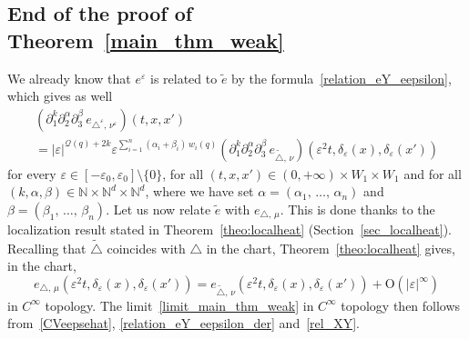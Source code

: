 \documentclass[AHL,Unicode,published]{cedram}
\newcommand*\N{\mathbb{N}}
\newcommand{\calQ}{\mathcal{Q}}
\newcommand{\rmO}{\mathrm{O}}
\begin{document}
\subsection{End of the proof of Theorem~\ref{main_thm_weak}}\label{sec_proof_weak_main_thm}
We already know that $e^\varepsilon$ is related to $\widetilde e$ by the formula~\eqref{relation_eY_eepsilon}, which gives as well
\begin{multline}\label{relation_eY_eepsilon_der}
\left(\partial_1^k \partial_2^\alpha \partial_3^\beta \, e_{\triangle^\varepsilon,\,\nu^\varepsilon}\right) (t,x,x') \\
= \vert\varepsilon\vert^{\calQ(q)+2k} \varepsilon^{\sum_{i=1}^n \left(\alpha_i+\beta_i\right)\,w_i(q)} \left(\partial_1^k \partial_2^\alpha \partial_3^\beta \, e_{\widetilde\triangle,\,\nu}\right) \left(\varepsilon^2 t,\delta_\varepsilon(x),\delta_\varepsilon(x')\right)
\end{multline}
for every $\varepsilon\in[-\varepsilon_0,\varepsilon_0]\setminus\{0\}$, for all $(t,x,x')\in(0,+\infty)\times W_1\times W_1$ and for all $(k,\alpha,\beta)\in\N\times\N^d\times\N^d$, where we have set $\alpha=(\alpha_1,\,\ldots,\,\alpha_n)$ and $\beta=(\beta_1,\,\ldots,\,\beta_n)$. Let us now relate $\widetilde e$ with $e_{\triangle,\,\mu}$. This is done thanks to the localization result stated in Theorem~\ref{theo:localheat} (Section~\ref{sec_localheat}). Recalling that $\widetilde\triangle$ coincides with $\triangle$ in the chart, Theorem~\ref{theo:localheat} gives, in the chart,
\begin{equation}\label{rel_XY}
e_{\triangle,\,\mu} \left(\varepsilon^2 t,\delta_\varepsilon(x),\delta_\varepsilon(x')\right) = e_{\widetilde\triangle,\,\nu} \left(\varepsilon^2 t,\delta_\varepsilon(x),\delta_\varepsilon(x')\right) + \rmO(\vert\varepsilon\vert^\infty)
\end{equation}
in $C^\infty$ topology. The limit~\eqref{limit_main_thm_weak} in $C^\infty$ topology then follows from~\eqref{CVeepsehat}, \eqref{relation_eY_eepsilon_der} and~\eqref{rel_XY}.


\goodbreak
\end{document}
